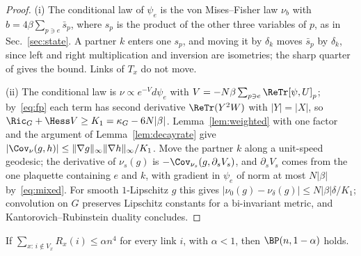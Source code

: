 \begin{proof}
(i) The conditional law of $\psi_e$ is the von Mises--Fisher law $\nu_b$ with
$b=4\beta\sum_{p\ni e}\bar s_p$, where $s_p$ is the product of the other three
variables of $p$, as in Sec.~\ref{sec:state}. A partner $k$ enters one
$s_p$, and moving it by $\delta_k$ moves $\bar s_p$ by $\delta_k$, since left and
right multiplication and inversion are isometries; the sharp quarter of
\cite{BB26a} gives the bound. Links of $T_x$ do not move.

(ii) The conditional law is $\nu\propto e^{-V}d\psi_e$ with $V=-N\beta
\sum_{p\ni e}\ReTr[\psi,U]_p$; by~\eqref{eq:fp} each term has second
derivative $\ReTr(Y^2W)$ with $|Y|=|X|$, so $\Ric_G+\Hess V\ge K_1=
\kappa_G-6N|\beta|$. Lemma~\ref{lem:weighted} with one factor and the argument
of Lemma~\ref{lem:decayrate} give $|\Cov_\nu(g,h)|\le\|\nabla g\|_\infty
\|\nabla h\|_\infty/K_1$. Move the partner $k$ along a unit-speed geodesic; the
derivative of $\nu_s(g)$ is $-\Cov_{\nu_s}(g,\partial_sV_s)$, and $\partial_sV_s$
comes from the one plaquette containing $e$ and $k$, with gradient in $\psi_e$
of norm at most $N|\beta|$ by~\eqref{eq:mixed}. For smooth $1$-Lipschitz $g$
this gives $|\nu_0(g)-\nu_\delta(g)|\le N|\beta|\delta/K_1$; convolution on $G$
preserves Lipschitz constants for a bi-invariant metric, and
Kantorovich--Rubinstein duality concludes.
\end{proof}

\begin{proposition}\label{prop:interiorbp}
If $\sum_{x:\,i\notin V_x}R_x(i)\le\alpha n^4$ for every link $i$, with
$\alpha<1$, then $\BP(n,1-\alpha)$ holds.
\end{proposition}

